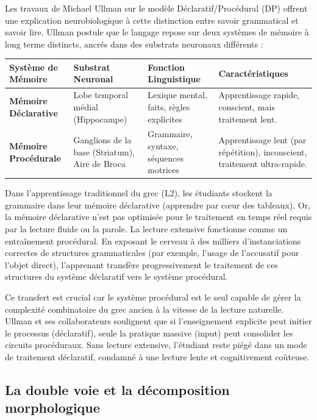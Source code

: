 Les travaux de Michael Ullman sur le modèle Déclaratif/Procédural (DP) offrent une explication
neurobiologique à cette distinction entre \og savoir grammatical\fg{} et \og savoir lire\fg{}.
Ullman postule que le langage repose sur deux systèmes de mémoire à long terme distincts, ancrés
dans des substrats neuronaux différents :

\begin{table}[h!]\small\centering\begin{tabular}{| p{2cm} | p{2.2cm} | p{2.2cm} | p{2.2cm} |}\hline\textbf{Système de Mémoire} & \textbf{Substrat Neuronal} & \textbf{Fonction Linguistique} & \textbf{Caractéristiques} \\ \hline\textbf{Mémoire Déclarative} & Lobe temporal médial (Hippocampe) & Lexique mental, faits, règles explicites & Apprentissage rapide, conscient, mais traitement lent. \\ \hline\textbf{Mémoire Procédurale} & Ganglions de la base (Striatum), Aire de Broca & Grammaire, syntaxe, séquences motrices & Apprentissage lent (par répétition), inconscient, traitement ultra-rapide. \\ \hline\end{tabular}\end{table}Dans l'apprentissage traditionnel du grec (L2), les étudiants stockent la grammaire dans leur
mémoire déclarative (apprendre \og par cœur\fg{} des tableaux). Or, la mémoire déclarative n'est pas
optimisée pour le traitement en temps réel requis par la lecture fluide ou la
parole.\cite{III-3-2-ref3} La lecture extensive fonctionne comme un \og entraînement
procédural\fg{}. En exposant le cerveau à des milliers d'instanciations correctes de structures
grammaticales (par exemple, l'usage de l'accusatif pour l'objet direct), l'apprenant transfère
progressivement le traitement de ces structures du système déclaratif vers le système
procédural.\cite{III-3-2-ref5}

Ce transfert est crucial car le système procédural est le seul capable de gérer la complexité
combinatoire du grec ancien à la vitesse de la lecture naturelle. Ullman et ses collaborateurs
soulignent que si l'enseignement explicite peut initier le processus (déclaratif), seule la pratique
massive (input) peut consolider les circuits procéduraux.\cite{III-3-2-ref6} Sans lecture extensive,
l'étudiant reste piégé dans un mode de traitement déclaratif, condamné à une lecture lente et
cognitivement coûteuse.



\subsection{La double voie et la décomposition morphologique}

